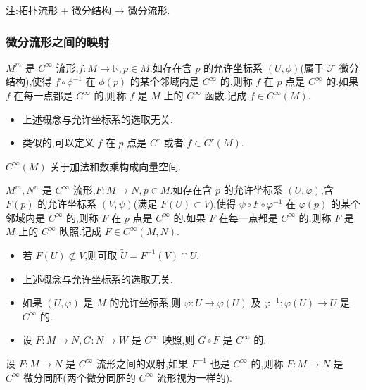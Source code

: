 注:拓扑流形 + 微分结构 → 微分流形.

\subsubsection{微分流形之间的映射}

\begin{definition}
$M^m$ 是 $C^\infty$ 流形,$f: M \to \mathbb{R}, p \in M$.如存在含 $p$ 的允许坐标系 $(U, \phi)$(属于 $\mathcal{F}$ 微分结构),使得 $f \circ \phi^{-1}$ 在 $\phi(p)$ 的某个邻域内是 $C^\infty$ 的,则称 $f$ 在 $p$ 点是 $C^\infty$ 的.如果 $f$ 在每一点都是 $C^\infty$ 的,则称 $f$ 是 $M$ 上的 $C^\infty$ 函数.记成 $f \in C^\infty(M)$.
\end{definition}

\begin{itemize}
    \item 上述概念与允许坐标系的选取无关.
    \item 类似的,可以定义 $f$ 在 $p$ 点是 $C^r$ 或者 $f \in C^r(M)$.
\end{itemize}

$C^\infty(M)$ 关于加法和数乘构成向量空间.

\begin{definition}
$M^m, N^n$ 是 $C^\infty$ 流形,$F : M \to N, p \in M$.如存在含 $p$ 的允许坐标系 $(U, \varphi)$,含 $F(p)$ 的允许坐标系 $(V, \psi)$(满足 $F(U) \subset V$),使得 $\psi \circ F \circ \varphi^{-1}$ 在 $\varphi(p)$ 的某个邻域内是 $C^\infty$ 的,则称 $F$ 在 $p$ 点是 $C^\infty$ 的.如果 $F$ 在每一点都是 $C^\infty$ 的,则称 $F$ 是 $M$ 上的 $C^\infty$ 映照.记成 $F \in C^\infty(M, N)$.
\end{definition}

\begin{itemize}
    \item 若 $F(U) \not\subset V$,则可取 $\tilde{U} = F^{-1}(V) \cap U$.
    \item 上述概念与允许坐标系的选取无关.
    \item 如果 $(U, \varphi)$ 是 $M$ 的允许坐标系,则 $\varphi: U \to \varphi(U)$ 及 $\varphi^{-1}: \varphi(U) \to U$ 是 $C^\infty$ 的.
    \item 设 $F : M \to N, G : N \to W$ 是 $C^\infty$ 映照,则 $G \circ F$ 是 $C^\infty$ 的.
\end{itemize}

\begin{definition}
设 $F : M \to N$ 是 $C^\infty$ 流形之间的双射,如果 $F^{-1}$ 也是 $C^\infty$ 的,则称 $F : M \to N$ 是 $C^\infty$ 微分同胚(两个微分同胚的 $C^\infty$ 流形视为一样的).
\end{definition}


